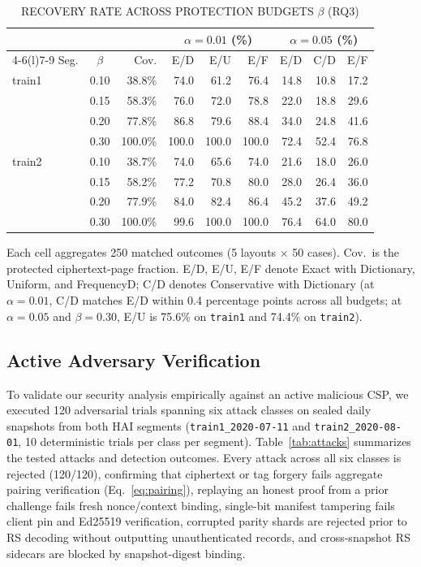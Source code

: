 \documentclass[10pt,journal]{IEEEtran}
\newcommand{\tabnote}[1]{\par\smallskip\parbox{\linewidth}{\footnotesize #1}}
\begin{document}
\begin{table}[t]\centering\small
\caption{RECOVERY RATE ACROSS PROTECTION BUDGETS $\beta$ (RQ3)}
\label{tab:budget-sweep}
\setlength{\tabcolsep}{3.0pt}
\begin{tabular}{@{}lcrrrrrrr@{}}\toprule
& & & \multicolumn{3}{c}{$\alpha=0.01$ (\%)} & \multicolumn{3}{c}{$\alpha=0.05$ (\%)}\\
\cmidrule(lr){4-6}\cmidrule(l){7-9}
Seg. & $\beta$ & Cov. & E/D & E/U & E/F & E/D & C/D & E/F\\\midrule
train1 & 0.10 & 38.8\% & 74.0 & 61.2 & 76.4 & 14.8 & 10.8 & 17.2\\
 & 0.15 & 58.3\% & 76.0 & 72.0 & 78.8 & 22.0 & 18.8 & 29.6\\
 & 0.20 & 77.8\% & 86.8 & 79.6 & 88.4 & 34.0 & 24.8 & 41.6\\
 & 0.30 & 100.0\% & 100.0 & 100.0 & 100.0 & 72.4 & 52.4 & 76.8\\\midrule
train2 & 0.10 & 38.7\% & 74.0 & 65.6 & 74.0 & 21.6 & 18.0 & 26.0\\
 & 0.15 & 58.2\% & 77.2 & 70.8 & 80.0 & 28.0 & 26.4 & 36.0\\
 & 0.20 & 77.9\% & 84.0 & 82.4 & 86.4 & 45.2 & 37.6 & 49.2\\
 & 0.30 & 100.0\% & 99.6 & 100.0 & 100.0 & 76.4 & 64.0 & 80.0\\\bottomrule
\end{tabular}
\tabnote{Each cell aggregates 250 matched outcomes (5 layouts $\times$ 50 cases). Cov.\ is the protected ciphertext-page fraction. E/D, E/U, E/F denote Exact with Dictionary, Uniform, and FrequencyD; C/D denotes Conservative with Dictionary (at $\alpha=0.01$, C/D matches E/D within 0.4 percentage points across all budgets; at $\alpha=0.05$ and $\beta=0.30$, E/U is 75.6\% on \texttt{train1} and 74.4\% on \texttt{train2}).}
\end{table}

\subsection{Active Adversary Verification}\label{sec:attacks}
To validate our security analysis empirically against an active malicious CSP, we executed 120 adversarial trials spanning six attack classes on sealed daily snapshots from both HAI segments (\texttt{train1\_2020-07-11} and \texttt{train2\_2020-08-01}, 10 deterministic trials per class per segment). Table~\ref{tab:attacks} summarizes the tested attacks and detection outcomes. Every attack across all six classes is rejected (120/120), confirming that ciphertext or tag forgery fails aggregate pairing verification (Eq.~\eqref{eq:pairing}), replaying an honest proof from a prior challenge fails fresh nonce/context binding, single-bit manifest tampering fails client pin and Ed25519 verification, corrupted parity shards are rejected prior to RS decoding without outputting unauthenticated records, and cross-snapshot RS sidecars are blocked by snapshot-digest binding.
\end{document}
